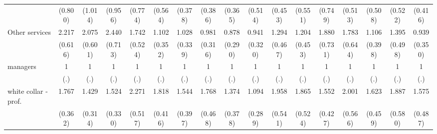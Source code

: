 {\begin{tabular}{l*{16}{c}}
                    &     (0.800)         &     (1.014)         &     (0.956)         &     (0.774)         &     (0.564)         &     (0.378)         &     (0.386)         &     (0.365)         &     (0.514)         &     (0.453)         &     (0.551)         &     (0.749)         &     (0.513)         &     (0.508)         &     (0.522)         &     (0.416)         \\
[1em]
Other services      &       2.217\sym{**} &       2.075\sym{*}  &       2.440\sym{**} &       1.742         &       1.102         &       1.028         &       0.981         &       0.878         &       0.941         &       1.294         &       1.204         &       1.880         &       1.783         &       1.106         &       1.395         &       0.939         \\
                    &     (0.616)         &     (0.601)         &     (0.713)         &     (0.524)         &     (0.352)         &     (0.339)         &     (0.316)         &     (0.290)         &     (0.320)         &     (0.467)         &     (0.453)         &     (0.731)         &     (0.644)         &     (0.398)         &     (0.498)         &     (0.350)         \\
[1em]
managers            &           1         &           1         &           1         &           1         &           1         &           1         &           1         &           1         &           1         &           1         &           1         &           1         &           1         &           1         &           1         &           1         \\
                    &         (.)         &         (.)         &         (.)         &         (.)         &         (.)         &         (.)         &         (.)         &         (.)         &         (.)         &         (.)         &         (.)         &         (.)         &         (.)         &         (.)         &         (.)         &         (.)         \\
[1em]
white collar - prof.&       1.767\sym{**} &       1.429         &       1.524         &       2.271\sym{***}&       1.818\sym{**} &       1.544         &       1.768\sym{*}  &       1.374         &       1.094         &       1.958\sym{*}  &       1.865\sym{*}  &       1.552         &       2.001\sym{*}  &       1.623         &       1.887\sym{*}  &       1.575         \\
                    &     (0.362)         &     (0.314)         &     (0.330)         &     (0.517)         &     (0.416)         &     (0.397)         &     (0.468)         &     (0.378)         &     (0.289)         &     (0.541)         &     (0.524)         &     (0.427)         &     (0.566)         &     (0.459)         &     (0.580)         &     (0.487)         \\

\end{tabular}}
